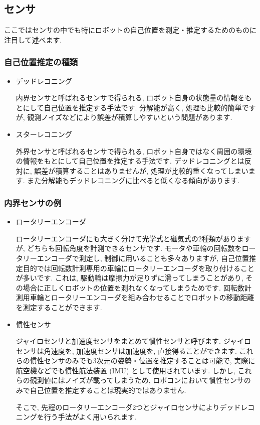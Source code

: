 \subsection{センサ}
ここではセンサの中でも特にロボットの自己位置を測定・推定するためのものに注目して述べます. 
\subsubsection{自己位置推定の種類}
\begin{itemize}
    \item デッドレコニング
    \par
    内界センサと呼ばれるセンサで得られる, ロボット自身の状態量の情報をもとにして自己位置を推定する手法です. 
    分解能が高く, 処理も比較的簡単ですが, 観測ノイズなどにより誤差が積算しやすいという問題があります. 
    \item スターレコニング
    \par
    外界センサと呼ばれるセンサで得られる, ロボット自身ではなく周囲の環境の情報をもとにして自己位置を推定する手法です. 
    デッドレコニングとは反対に, 誤差が積算することはありませんが, 処理が比較的重くなってしまいます. また分解能もデッドレコニングに比べると低くなる傾向があります. 
\end{itemize}
\subsubsection{内界センサの例}
\begin{itemize}
    \item ロータリーエンコーダ
    \par
    ロータリーエンコーダにも大きく分けて光学式と磁気式の2種類がありますが, どちらも回転角度を計測できるセンサです. 
    モータや車輪の回転数をロータリーエンコーダで測定し, 制御に用いることも多々ありますが, 自己位置推定目的では回転数計測専用の車輪にロータリーエンコーダを取り付けることが多いです. 
    これは, 駆動輪は摩擦力が足りずに滑ってしまうことがあり, その場合に正しくロボットの位置を測れなくなってしまうためです. 
    回転数計測用車輪とロータリーエンコーダを組み合わせることでロボットの移動距離を測定することができます. 
    
    \item 慣性センサ
    \par
    ジャイロセンサと加速度センサをまとめて慣性センサと呼びます. ジャイロセンサは角速度を, 加速度センサは加速度を, 直接得ることができます. これらの慣性センサのみでも3次元の姿勢・位置を推定することは可能で, 実際に航空機などでも慣性航法装置 (IMU) として使用されています. しかし, これらの観測値にはノイズが載ってしまうため, ロボコンにおいて慣性センサのみで自己位置を推定することは現実的ではありません. \par
    そこで, 先程のロータリーエンコーダ2つとジャイロセンサによりデッドレコニングを行う手法がよく用いられます. 
\end{itemize}
